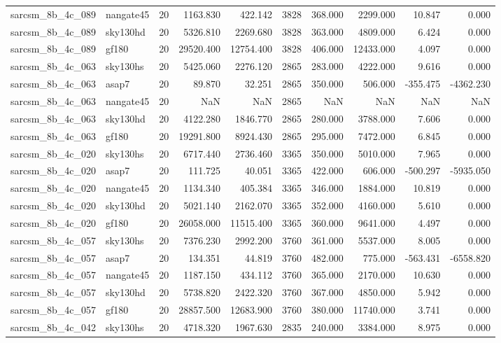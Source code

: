 \begin{longtable}{llrrrrrrrr}
sarcsm\_8b\_4c\_089 & nangate45 & 20 & 1163.830 & 422.142 & 3828 & 368.000 & 2299.000 & 10.847 & 0.000 \\
sarcsm\_8b\_4c\_089 & sky130hd & 20 & 5326.810 & 2269.680 & 3828 & 363.000 & 4809.000 & 6.424 & 0.000 \\
sarcsm\_8b\_4c\_089 & gf180 & 20 & 29520.400 & 12754.400 & 3828 & 406.000 & 12433.000 & 4.097 & 0.000 \\
sarcsm\_8b\_4c\_063 & sky130hs & 20 & 5425.060 & 2276.120 & 2865 & 283.000 & 4222.000 & 9.616 & 0.000 \\
sarcsm\_8b\_4c\_063 & asap7 & 20 & 89.870 & 32.251 & 2865 & 350.000 & 506.000 & -355.475 & -4362.230 \\
sarcsm\_8b\_4c\_063 & nangate45 & 20 & NaN & NaN & 2865 & NaN & NaN & NaN & NaN \\
sarcsm\_8b\_4c\_063 & sky130hd & 20 & 4122.280 & 1846.770 & 2865 & 280.000 & 3788.000 & 7.606 & 0.000 \\
sarcsm\_8b\_4c\_063 & gf180 & 20 & 19291.800 & 8924.430 & 2865 & 295.000 & 7472.000 & 6.845 & 0.000 \\
sarcsm\_8b\_4c\_020 & sky130hs & 20 & 6717.440 & 2736.460 & 3365 & 350.000 & 5010.000 & 7.965 & 0.000 \\
sarcsm\_8b\_4c\_020 & asap7 & 20 & 111.725 & 40.051 & 3365 & 422.000 & 606.000 & -500.297 & -5935.050 \\
sarcsm\_8b\_4c\_020 & nangate45 & 20 & 1134.340 & 405.384 & 3365 & 346.000 & 1884.000 & 10.819 & 0.000 \\
sarcsm\_8b\_4c\_020 & sky130hd & 20 & 5021.140 & 2162.070 & 3365 & 352.000 & 4160.000 & 5.610 & 0.000 \\
sarcsm\_8b\_4c\_020 & gf180 & 20 & 26058.000 & 11515.400 & 3365 & 360.000 & 9641.000 & 4.497 & 0.000 \\
sarcsm\_8b\_4c\_057 & sky130hs & 20 & 7376.230 & 2992.200 & 3760 & 361.000 & 5537.000 & 8.005 & 0.000 \\
sarcsm\_8b\_4c\_057 & asap7 & 20 & 134.351 & 44.819 & 3760 & 482.000 & 775.000 & -563.431 & -6558.820 \\
sarcsm\_8b\_4c\_057 & nangate45 & 20 & 1187.150 & 434.112 & 3760 & 365.000 & 2170.000 & 10.630 & 0.000 \\
sarcsm\_8b\_4c\_057 & sky130hd & 20 & 5738.820 & 2422.320 & 3760 & 367.000 & 4850.000 & 5.942 & 0.000 \\
sarcsm\_8b\_4c\_057 & gf180 & 20 & 28857.500 & 12683.900 & 3760 & 380.000 & 11740.000 & 3.741 & 0.000 \\
sarcsm\_8b\_4c\_042 & sky130hs & 20 & 4718.320 & 1967.630 & 2835 & 240.000 & 3384.000 & 8.975 & 0.000 \\

\end{longtable}
